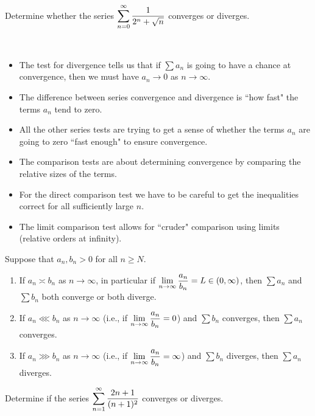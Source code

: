 \begin{example}
Determine whether the series $\displaystyle\sum_{n=0}^\infty\frac{1}{2^n+\sqrt n}$  converges or diverges.
\end{example}

\newpage

\begin{remark}\,
\begin{itemize}
\item The test for divergence tells us that if $\sum a_n$ is going to have a chance at convergence, then we must have $a_n\to 0$ as $n\to\infty$.
\item The difference between series convergence and divergence is ``how fast" the terms $a_n$ tend to zero.
\item All the other series tests are trying to get a sense of whether the terms $a_n$ are going to zero ``fast enough" to ensure convergence.
\item The comparison tests are about determining convergence by comparing the relative sizes of the terms.
\item For the direct comparison test we have to be careful to get the inequalities correct for all sufficiently large $n$.
\item The limit comparison test allows for ``cruder" comparison using limits (relative orders at infinity).
\end{itemize}
\end{remark}

\begin{theorem}
Suppose that $a_n, b_n>0$ for all $n\ge N$.
\begin{enumerate}
\item If $a_n\asymp b_n$ as $n\to\infty$, in particular if $\displaystyle\lim_{n\to\infty}\frac{a_n}{b_n}=L\in (0,\infty)$, 
then $\sum a_n$ and $\sum b_n$ both converge or both diverge.
\item If $a_n\lll b_n$ as $n\to\infty$ (i.e., if $\displaystyle\lim_{n\to\infty}\frac{a_n}{b_n}=0$) and $\sum b_n$ converges, then $\sum a_n$ converges.
\item If $a_n\ggg b_n$ as $n\to\infty$ (i.e., if $\displaystyle\lim_{n\to\infty}\frac{a_n}{b_n}=\infty$) and $\sum b_n$ diverges, then $\sum a_n$ diverges.
\end{enumerate}
\end{theorem}

\newpage

\begin{example}
Determine if the series $\displaystyle\sum_{n=1}^\infty\frac{2n+1}{(n+1)^2}$ converges or diverges.
\end{example}

